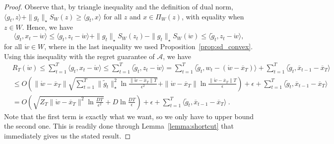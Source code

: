 \documentclass[12pt]{colt2018} %
\newcommand{\ol}{\mathcal{A}}
\newcommand{\w}{\mathring{w}}
\begin{document}
\begin{proof}
Observe that, by triangle inequality and the definition of dual norm, $\langle g_t,z\rangle +\|g_t\|_\star S_W(z) \ge \langle g_t, x\rangle$ for all $z$ and $x \in \Pi_W(z)$, with equality when $z\in W$. Hence, we have
\begin{equation}
\label{eq:metagrad_loss_bound}
\langle g_t,x_t-\w\rangle 
\le \langle g_t,z_t - \w\rangle + \|g_t\|_\star S_W(z_t)-\|g_t\|_\star S_W(\w)
\le \langle \tilde{g}_t, z_t-\w\rangle,
\end{equation}
for all $\w\in W$, where in the last inequality we used Proposition~\ref{prop:sd_convex}.
Using this inequality with the regret guarantee of $\ol$, we have
\begin{align*}
&R_T(\w)
\le\sum_{t=1}^T \langle g_t, x_t-\w\rangle
\leq \sum_{t=1}^T \langle \tilde g_t, z_t-\w\rangle
=\sum_{t=1}^T \langle \tilde{g}_t, w_t - (\w-\overline{x}_T)\rangle + \sum_{t=1}^T \langle \tilde{g}_t, \overline{x}_{t-1} - \overline{x}_T\rangle \\
&\leq O\left(\|\w-\overline{x}_T\|\sqrt{\sum_{t=1}^T \|\tilde{g}_t\|_\star ^2 \ln\frac{\|\w-\overline{x}_T\|T}{\epsilon^2}} + \|\w-\overline{x}_T\| \ln\frac{\|\w-\overline{x}_T\| T}{\epsilon}\right) + \epsilon+\sum_{t=1}^T \langle \tilde{g}_t, \overline{x}_{t-1} - \overline{x}_T\rangle \\
&=O\left(\sqrt{Z_T \|\w-\overline{x}_T\|^2 \ln\frac{DT}{\epsilon^2}} + D \ln\frac{D T}{\epsilon}\right) +  \epsilon + \sum_{t=1}^T \langle \tilde{g}_t, \overline{x}_{t-1} - \overline{x}_T\rangle~.
\end{align*}
Note that the first term is exactly what we want, so we only have to upper bound the second one. This is readily done through Lemma~\ref{lemma:shortcut} that immediately gives us the stated result.
\end{proof}
\end{document}
